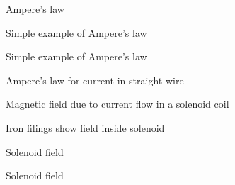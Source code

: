 \documentclass[compress]{beamer}
\makeatletter
\let\beamer@writeslidentry@miniframeson=\beamer@writeslidentry
\def\beamer@writeslidentry@miniframesoff{%
  \expandafter\beamer@ifempty\expandafter{\beamer@framestartpage}{}%
  {%
    \clearpage\beamer@notesactions%
  }
}
\newcommand*{\miniframeson}{\let\beamer@writeslidentry=\beamer@writeslidentry@miniframeson}
\newcommand*{\miniframesoff}{\let\beamer@writeslidentry=\beamer@writeslidentry@miniframesoff}
\makeatother
\begin{document}

{
    \begin{frame}{Ampere's law}
    \end{frame}
}


{
    \begin{frame}{Simple example of Ampere's law}
    \end{frame}
}

\miniframesoff
{
    \begin{frame}{Simple example of Ampere's law}
    \end{frame}
}
\miniframeson


{
    \begin{frame}{Ampere's law for current in straight wire}
    \end{frame}
}


{
    \begin{frame}{Magnetic field due to current flow in a solenoid coil}
    \end{frame}
}


{
    \begin{frame}{Iron filings show field inside solenoid}
    \end{frame}
}


{
    \begin{frame}{Solenoid field}
    \end{frame}
}


{
    \begin{frame}{Solenoid field}
    \end{frame}
}
\end{document}
